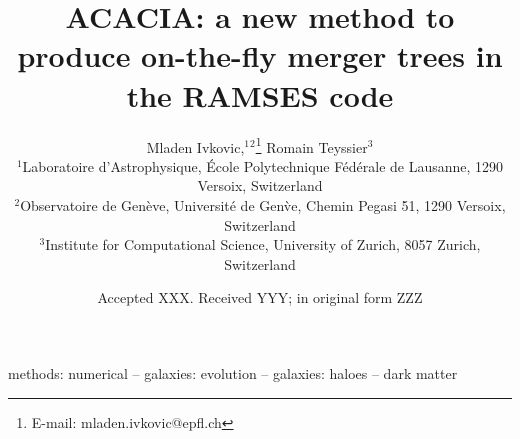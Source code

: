 \documentclass[a4paper,twocolumn,fleqn,usenatbib]{mnras}
\title[ACACIA]{{ACACIA}: a new method to produce on-the-fly merger trees in the RAMSES code }
\author[Mladen Ivkovic]{
    Mladen Ivkovic,$^{1}$$^{2}$\thanks{E-mail: mladen.ivkovic@epfl.ch}
    Romain Teyssier$^{3}$
    \\
    $^{1}$Laboratoire d'Astrophysique, \'Ecole Polytechnique F\'ed\'erale de Lausanne, 1290 Versoix, Switzerland\\
    $^{2}$Observatoire de Gen\`eve, Universit\'e de Gen\`ve, Chemin Pegasi 51, 1290 Versoix, Switzerland\\
    $^{3}$Institute for Computational Science, University of Zurich, 8057 Zurich, Switzerland\\
}
\date{Accepted XXX. Received YYY; in original form ZZZ}
\begin{document}
    \label{firstpage}
    \pagerange{\pageref{firstpage}--\pageref{lastpage}}
    \maketitle
    
    
    
    \begin{keywords}
    	methods: numerical -- galaxies: evolution -- galaxies: haloes -- dark matter
    \end{keywords}
    

     
    
    
    

    
    
    
    
    
    
    
           
       
       
       
       


    
    
    
    \appendix
   	

   	
  	
	\bsp	%
	\label{lastpage}
\end{document}
